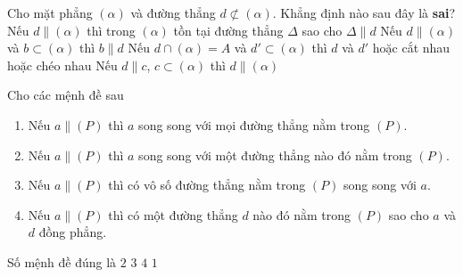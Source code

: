 	\begin{ex}%
		Cho mặt phẳng $(\alpha)$ và đường thẳng $d \not\subset (\alpha)$. Khẳng định nào sau đây là \textbf{sai}?
		\choice
		{Nếu $d \parallel (\alpha)$ thì trong $(\alpha)$ tồn tại đường thẳng $\Delta$ sao cho $\Delta \parallel d$}
		{\True Nếu $d \parallel (\alpha)$ và $b \subset (\alpha)$ thì $b \parallel d$}
		{Nếu $d \cap (\alpha)=A$ và $d' \subset (\alpha)$ thì $d$ và $d'$ hoặc cắt nhau hoặc chéo nhau}
		{Nếu $d \parallel c$, $c \subset (\alpha)$ thì $d \parallel (\alpha)$}
	\end{ex}

	\begin{ex}%
		Cho các mệnh đề sau
		\begin{enumerate}[1.]
			\item Nếu $a \parallel (P)$ thì $a$ song song với mọi đường thẳng nằm trong $(P)$.
			\item Nếu $a \parallel (P)$ thì $a$ song song với một đường thẳng nào đó nằm trong $(P)$.
			\item Nếu $a \parallel (P)$ thì có vô số đường thẳng nằm trong $(P)$ song song với $a$.
			\item Nếu $a \parallel (P)$ thì có một đường thẳng $d$ nào đó nằm trong $(P)$ sao cho $a$ và $d$ đồng phẳng.
		\end{enumerate}
		Số mệnh đề đúng là
		\choice
		{$2$}
		{\True $3$}
		{$4$}
		{$1$}
	\end{ex}

